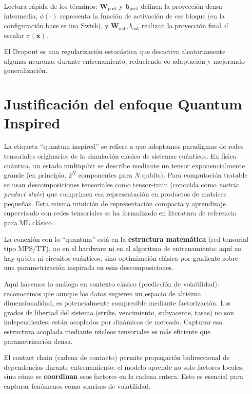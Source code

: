 Lectura rápida de los términos: $\mathbf{W}_{\text{post}}$ y $\mathbf{b}_{\text{post}}$ definen la proyección densa intermedia, $\phi(\cdot)$ representa la función de activación de ese bloque (en la configuración base se usa Swish), y $\mathbf{W}_{\text{out}}, b_{\text{out}}$ realizan la proyección final al escalar $\hat{\sigma}(\mathbf{x})$.

El Dropout es una regularización estocástica que desactiva aleatoriamente algunas neuronas durante entrenamiento, reduciendo co-adaptación y mejorando generalización.

\section{Justificación del enfoque Quantum Inspired}

La etiqueta ``quantum inspired'' se refiere a que adoptamos paradigmas de redes tensoriales originarios de la simulación clásica de sistemas cuánticos. En física cuántica, un estado multiqubit se describe mediante un tensor exponencialmente grande (en principio, $2^N$ componentes para $N$ qubits). Para computación tratable se usan descomposiciones tensoriales como tensor-train (conocida como \emph{matrix product state}) que comprimen esa representación en productos de matrices pequeñas. Esta misma intuición de representación compacta y aprendizaje supervisado con redes tensoriales se ha formalizado en literatura de referencia para ML clásico \citep{stoudenmire2016supervised,novikov2015tensorizing}.

La conexión con lo ``quantum'' está en la \textbf{estructura matemática} (red tensorial tipo MPS/TT), no en el hardware ni en el algoritmo de entrenamiento: aquí no hay qubits ni circuitos cuánticos, sino optimización clásica por gradiente sobre una parametrización inspirada en esas descomposiciones.

Aquí hacemos lo análogo en contexto clásico (predicción de volatilidad): reconocemos que aunque los datos sugieren un espacio de altísima dimensionalidad, es potencialmente compresible mediante factorización. Los grados de libertad del sistema (strike, vencimiento, subyacente, tasas) no son independientes; están acoplados por dinámicas de mercado. Capturar esa estructura acoplada mediante núcleos tensoriales es más eficiente que parametrización densa.

El contact chain (cadena de contacto) permite propagación bidireccional de dependencias durante entrenamiento: el modelo aprende no solo factores locales, sino cómo se \textbf{coordinan} esos factores en la cadena entera. Esto es esencial para capturar fenómenos como sonrisas de volatilidad.


